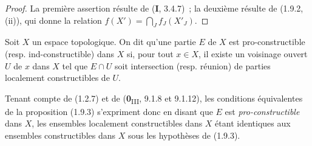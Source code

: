 \begin{proof}
La première assertion résulte de (\textbf{I}, 3.4.7)~; la deuxième résulte de (1.9.2,
(ii)), qui donne la relation $f(X')=\bigcap_Jf_J(X'_J)$.
\end{proof}

\begin{definition}[1.9.4]
\label{IV.1.9.4-fr}
Soit $X$ un espace topologique. On dit qu'une partie $E$ de $X$ est
pro-constructible \textup{(resp.} ind-constructible\textup{)} dans $X$ si, pour
tout $x\in X$, il existe un voisinage ouvert $U$ de $x$ dans $X$ tel que
$E\cap U$ soit intersection \textup{(resp.} réunion\textup{)} de parties localement
constructibles de $U$.
\end{definition}

Tenant compte de (1.2.7) et de (\textbf{0}\textsubscript{III}, 9.1.8 et 9.1.12), les
conditions équivalentes de la proposition (1.9.3) s'expriment donc en disant
que $E$ est \emph{pro-constructible} dans $X$, les ensembles localement
constructibles dans $X$ étant identiques aux ensembles constructibles dans
$X$ sous les hypothèses de (1.9.3).


